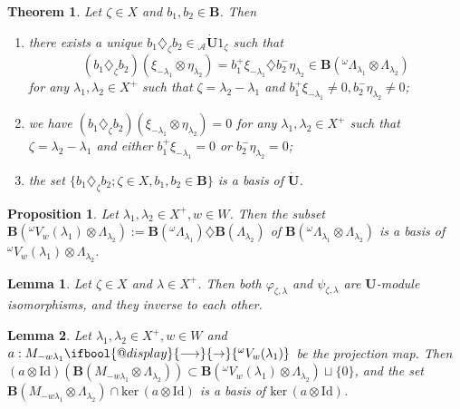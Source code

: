\documentclass[10pt,a4paper]{amsart}
\makeatletter
\newtheorem{theorem}{Theorem}
\newtheorem{proposition}{Proposition}
\newtheorem{lemma}{Lemma}
\def\L{\Lambda}
\def\l{\lambda}
\def\o{\omega}
\renewcommand{\to}{%
   \ifbool{@display}{\longrightarrow}{\rightarrow}%
   }
\makeatother
\begin{document}
\begin{theorem}\label{25.2.1}
Let $\zeta\in X$ and $b_1,b_2\in \mathbf{B}$. Then 
\begin{enumerate}
\item there exists a unique $b_1\diamondsuit_{\zeta}b_2\in {_{\mathcal{A}}\dot{\mathbf{U}}1_{\zeta}}$ such that 
$$(b_1\diamondsuit_{\zeta}b_2)(\xi_{-\lambda_1}\otimes \eta_{\lambda_2})=b_1^+\xi_{-\lambda_1}\diamondsuit b_2^-\eta_{\lambda_2}\in \mathbf{B}({^{\omega}\Lambda_{\lambda_1}}\otimes \Lambda_{\lambda_2})$$
for any $\lambda_1,\lambda_2\in X^+$ such that $\zeta=\lambda_2-\lambda_1$ and $b_1^+\xi_{-\lambda_1}\neq0, b_2^-\eta_{\lambda_2}\neq0$;
\item we have $(b_1\diamondsuit_{\zeta}b_2)(\xi_{-\lambda_1}\otimes \eta_{\lambda_2})=0$
for any $\lambda_1,\lambda_2\in X^+$ such that $\zeta=\lambda_2-\lambda_1$ and either $b_1^+\xi_{-\lambda_1}=0$ or $b_2^-\eta_{\lambda_2}=0$;
\item the set $\{b_1\diamondsuit_{\zeta}b_2;\zeta\in X,b_1,b_2\in \mathbf{B}\}$ is a basis of $\dot{\mathbf{U}}$.
\end{enumerate}
\end{theorem}

\begin{proposition}\label{canonical basis of demazure otimes highest weight}
Let $\lambda_1,\lambda_2\in X^+,w\in W$. Then the subset $\mathbf{B}({^{\omega}V_{w}(\lambda_1)}\otimes \Lambda_{\lambda_2}):=\mathbf{B}(^\o \L_{\l_1}) \diamondsuit \mathbf{B}(\Lambda_{\lambda_2})$ of $\mathbf{B}({^{\omega}\Lambda_{\lambda_1}}\otimes \Lambda_{\lambda_2})$ is a basis of ${^{\omega}V_{w}(\lambda_1)}\otimes \Lambda_{\lambda_2}$. 
\end{proposition}

\begin{lemma}\label{isomorphism varphi}
Let $\zeta\in X$ and $\lambda\in X^+$. Then both $\varphi_{\zeta, \l}$ and $\psi_{\zeta,\l}$ are $\mathbf{U}$-module isomorphisms, and they inverse to each other.
\end{lemma}

\begin{lemma}\label{a otimes Id is a based map}
Let $\lambda_1,\lambda_2\in X^+,w\in W$ and $a: M_{-w\l_1} \to {^{\omega}V_w(\lambda_1)}$ be the projection map. Then $(a\otimes \mathrm{Id})(\mathbf{B}(M_{-w\lambda_1}\otimes \Lambda_{\lambda_2})) \subset \mathbf{B}({^{\omega}V_{w}(\lambda_1)}\otimes \Lambda_{\lambda_2})\sqcup \{0\}$, and the set $\mathbf{B}(M_{-w\lambda_1}\otimes \Lambda_{\lambda_2})\cap \mathrm{ker}\,(a\otimes \mathrm{Id})$ is a basis of $\mathrm{ker}\,(a\otimes \mathrm{Id})$.
\end{lemma}
\end{document}
